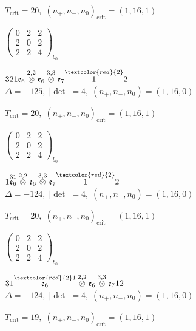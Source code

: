 \documentclass[10pt]{article}
\begin{document}
\hspace{1em}$T_{\text{crit}}=20,\; (n_+,n_-,n_0)_{\text{crit}}=(1,16,1)$

\hspace{2em}$\left(\begin{smallmatrix}0 & 2 & 2 \\ 2 & 0 & 2 \\ 2 & 2 & 4\end{smallmatrix}\right)_{\!b_0}$

\smallskip

$321\mathfrak{e}_6\overset{2,2}{\otimes}\mathfrak{e}_6\overset{3,3}{\otimes}\mathfrak{e}_7\overset{\textcolor{red}{2}}{1}2$ \quad $\Delta=-125,\; |\det|=4,\; (n_+,n_-,n_0)=(1,16,0)$

\hspace{1em}$T_{\text{crit}}=20,\; (n_+,n_-,n_0)_{\text{crit}}=(1,16,1)$

\hspace{2em}$\left(\begin{smallmatrix}0 & 2 & 2 \\ 2 & 0 & 2 \\ 2 & 2 & 4\end{smallmatrix}\right)_{\!b_0}$

\smallskip

$1\overset{31}{\mathfrak{e}_6}\overset{2,2}{\otimes}\mathfrak{e}_6\overset{3,3}{\otimes}\mathfrak{e}_7\overset{\textcolor{red}{2}}{1}2$ \quad $\Delta=-124,\; |\det|=4,\; (n_+,n_-,n_0)=(1,16,0)$

\hspace{1em}$T_{\text{crit}}=20,\; (n_+,n_-,n_0)_{\text{crit}}=(1,16,1)$

\hspace{2em}$\left(\begin{smallmatrix}0 & 2 & 2 \\ 2 & 0 & 2 \\ 2 & 2 & 4\end{smallmatrix}\right)_{\!b_0}$

$31\overset{\textcolor{red}{2}1}{\mathfrak{e}_6}\overset{2,2}{\otimes}\mathfrak{e}_6\overset{3,3}{\otimes}\mathfrak{e}_712$ \quad $\Delta=-124,\; |\det|=4,\; (n_+,n_-,n_0)=(1,16,0)$

\hspace{1em}$T_{\text{crit}}=19,\; (n_+,n_-,n_0)_{\text{crit}}=(1,16,1)$
\end{document}
